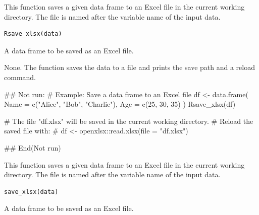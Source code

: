 \documentclass[a4paper]{book}
\begin{document}
%
\begin{Description}
This function saves a given data frame to an Excel file in the current working directory.
The file is named after the variable name of the input data.
\end{Description}
%
\begin{Usage}
\begin{verbatim}
Rsave_xlsx(data)
\end{verbatim}
\end{Usage}
%
\begin{Arguments}
\begin{ldescription}
\item[\code{data}] A data frame to be saved as an Excel file.
\end{ldescription}
\end{Arguments}
%
\begin{Value}
None. The function saves the data to a file and prints the save path and a reload command.
\end{Value}
%
\begin{Examples}
\begin{ExampleCode}
## Not run: 
# Example: Save a data frame to an Excel file
df <- data.frame(
  Name = c("Alice", "Bob", "Charlie"),
  Age = c(25, 30, 35)
)
Rsave_xlsx(df)

# The file "df.xlsx" will be saved in the current working directory.
# Reload the saved file with:
# df <- openxlsx::read.xlsx(file = "df.xlsx")

## End(Not run)
\end{ExampleCode}
\end{Examples}
%
\begin{Description}
This function saves a given data frame to an Excel file in the current working directory.
The file is named after the variable name of the input data.
\end{Description}
%
\begin{Usage}
\begin{verbatim}
save_xlsx(data)
\end{verbatim}
\end{Usage}
%
\begin{Arguments}
\begin{ldescription}
\item[\code{data}] A data frame to be saved as an Excel file.
\end{ldescription}
\end{Arguments}
\end{document}
